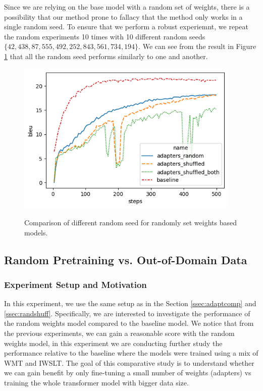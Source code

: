 Since we are relying on the base model with a random set of weights, there is a possibility that our method prone to fallacy that the method only works in a single random seed. To ensure that we perform a robust experiemnt, we repeat the random experiments 10 times with 10 different random seeds $\{42, 438, 87, 555, 492, 252, 843, 561, 734, 194\}$. We can see from the result in Figure \ref{img:rndmseed} that all the random seed performs similarly to one and another.

\begin{figure}[h]
    {\includegraphics[width=0.95\textwidth]{img/randomshuffled.png}}
    \centering
    \caption{Comparison of different random seed for randomly set weights based models.}
    \label{img:rndmseed}
\end{figure}

\subsection{Random Pretraining vs. Out-of-Domain Data}
\label{ssec:randpre}
\subsubsection{Experiment Setup and Motivation}
In this experiment, we use the same setup as in the Section \ref{ssec:adaptcomp} and \ref{ssec:randshuff}. Specifically, we are interested to investigate the performance of the random weights model compared to the baseline model. We notice that from the previous experiments, we can gain a reasonable score with the random weights model, in this experiment we are conducting further study the performance relative to the baseline where the models were trained using a mix of WMT and IWSLT. The goal of this comparative study is to understand whether we can gain benefit by only fine-tuning a small number of weights (adapters) vs training the whole transformer model with bigger data size.

